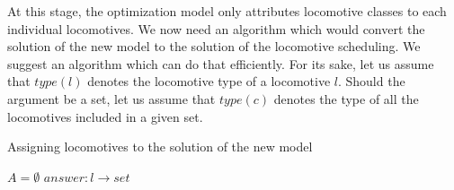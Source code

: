At this stage, the optimization model only attributes locomotive classes to each individual locomotives. We now need an algorithm which would convert the solution of the new model to the solution of the locomotive scheduling. We suggest an algorithm which can do that efficiently. For its sake, let us assume that $type(l)$ denotes the locomotive type of a locomotive $l$. Should the argument be a set, let us assume that $type(c)$ denotes the type of all the locomotives included in a given set.

\begin{algorithm}[H]
	\SetAlgoLined
	\caption{Assigning locomotives to the solution of the new model}
	$A = \emptyset$ \;
	$answer: l \rightarrow set$\;
\end{algorithm}